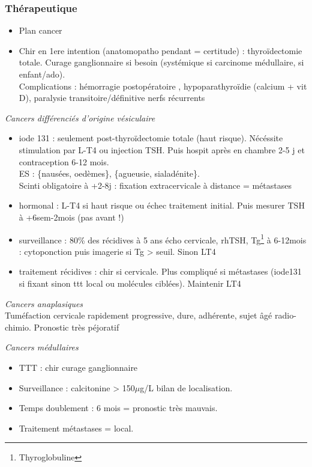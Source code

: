 \documentclass{book}
\begin{document}
\subsubsection{Thérapeutique}
\label{sec:org51f5e02}
\begin{itemize}
\item Plan cancer
\item Chir en 1ere intention (anatomopatho pendant = certitude) : thyroïdectomie
totale. Curage ganglionnaire si besoin (systémique si carcinome médullaire,
si enfant/ado). \\
Complications : hémorragie postopératoire \faBomb,  hypoparathyroïdie (calcium + vit D), paralysie transitoire/définitive nerfs récurrents
\end{itemize}
\vspace*{10pt}

\emph{Cancers différenciés d'origine vésiculaire}
\begin{itemize}
\item iode 131 : seulement post-thyroïdectomie totale (haut risque). Nécéssite
stimulation par L-T4 ou injection TSH. Puis hospit après en chambre 2-5 j
et contraception 6-12 mois. \\
ES : \{nausées, oedèmes\}, \{agueusie, sialadénite\}. \\
Scinti  obligatoire à +2-8j : fixation extracervicale à  distance = métastases
\item hormonal : L-T4 si haut risque ou échec traitement initial. Puis mesurer TSH à
+6sem-2mois (pas avant !)
\item surveillance : 80\% des récidives à 5 ans \thus écho cervicale, rhTSH,
Tg\footnote{Thyroglobuline} à 6-12mois : cytoponction puis imagerie si Tg > seuil. Sinon \dec LT4
\item traitement récidives : chir si cervicale. Plus compliqué si métastases
(iode131 si fixant sinon ttt local ou molécules ciblées). Maintenir LT4
\end{itemize}

\emph{Cancers anaplasiques}\\
Tuméfaction cervicale rapidement progressive, dure, adhérente, sujet âgé \thus radio-chimio. Pronostic très péjoratif

\emph{Cancers médullaires}
\begin{itemize}
\item TTT : chir \textpm{} curage ganglionnaire
\item Surveillance : calcitonine > 150\(\mu\)g/L \thus bilan de localisation.
\item Temps doublement : 6 mois = pronostic très mauvais.
\item Traitement métastases = local.
\end{itemize}
\end{document}
